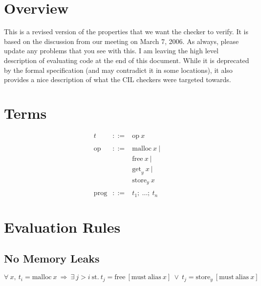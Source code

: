 \documentclass{article}
\begin{document}
\section{Overview}

This is a revised version of the properties that we want the checker to
verify.  It is based on the discussion from our meeting on March 7, 2006.  As
always, please update any problems that you see with this.  I am leaving the
high level description of evaluating code at the end of this document.  While
it is deprecated by the formal specification (and may contradict it in some
locations), it also provides a nice description of what the CIL checkers were
targeted towards.


\section{Terms}

\begin{eqnarray*}
t & ::= & \mathrm{op} \ x \\
%
& & \\
%
\mathrm{op} & ::= & \mathrm{malloc} \ x \ | \\
        & & \mathrm{free} \ x \ | \\ 
        & & \mathrm{get}_{y} \ x \ | \\
        & & \mathrm{store}_{y} \ x \\
%
& & \\
%
\mathrm{prog} & ::= & t_{1}; \ \ldots; \ t_{n}
\end{eqnarray*}


\section{Evaluation Rules}

\subsection{No Memory Leaks}

\begin{displaymath}
%
\forall \ x, \ t_{i} = \mathrm{malloc} \ x \ 
%
\Rightarrow \
%
\exists \ j > i \ 
%
\mathrm{st.} \
%
t_{j} = \mathrm{free} \ [\mathrm{must \ alias} \ x] \ 
%
\vee \ t_{j} = \mathrm{store}_{y} \ [\mathrm{must \ alias} \ x] 
\end{displaymath}
\end{document}
